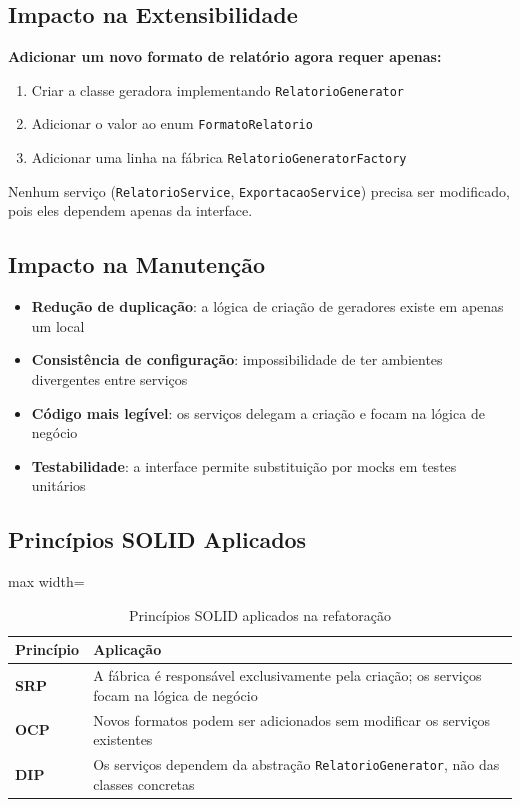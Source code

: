 \documentclass[12pt, a4paper]{article}
\begin{document}
\subsection{Impacto na Extensibilidade}

\textbf{Adicionar um novo formato de relatório agora requer apenas:}

\begin{enumerate}
    \item Criar a classe geradora implementando \texttt{RelatorioGenerator}
    \item Adicionar o valor ao enum \texttt{FormatoRelatorio}
    \item Adicionar uma linha na fábrica \texttt{RelatorioGeneratorFactory}
\end{enumerate}

Nenhum serviço (\texttt{RelatorioService}, \texttt{ExportacaoService}) precisa ser modificado, pois eles dependem apenas da interface.

\subsection{Impacto na Manutenção}

\begin{itemize}
    \item \textbf{Redução de duplicação}: a lógica de criação de geradores existe em apenas um local
    \item \textbf{Consistência de configuração}: impossibilidade de ter ambientes divergentes entre serviços
    \item \textbf{Código mais legível}: os serviços delegam a criação e focam na lógica de negócio
    \item \textbf{Testabilidade}: a interface permite substituição por mocks em testes unitários
\end{itemize}

\subsection{Princípios SOLID Aplicados}

\begin{table}[h!]
\centering
\begin{adjustbox}{max width=\textwidth}
\begin{tabular}{>{\bfseries}l p{10cm}}
\toprule
\textbf{Princípio} & \textbf{Aplicação} \\
\midrule
SRP & A fábrica é responsável exclusivamente pela criação; os serviços focam na lógica de negócio \\
OCP & Novos formatos podem ser adicionados sem modificar os serviços existentes \\
DIP & Os serviços dependem da abstração \texttt{RelatorioGenerator}, não das classes concretas \\
\bottomrule
\end{tabular}
\end{adjustbox}
\caption{Princípios SOLID aplicados na refatoração}
\end{table}
\end{document}
